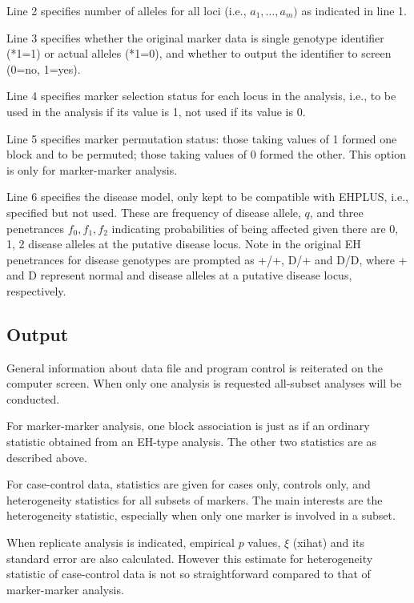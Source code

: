 \documentclass[11pt]{article}
\begin{document}
\medskip
\noindent Line 2 specifies number of alleles for all loci (i.e., $a_1,
\ldots, a_m)$ as indicated in line 1.

\medskip
\noindent Line 3 specifies whether the original marker data is single genotype identifier
(*1=1) or actual alleles (*1=0), and whether to output the identifier to screen
(0=no, 1=yes).

\medskip
\noindent Line 4 specifies marker selection status for each locus in the analysis, i.e.,
to be used in the analysis if its value is 1, not used if its value is 0.

\medskip
\noindent Line 5 specifies marker permutation status:  those taking values of 1 formed
one block and to be permuted; those taking values of 0 formed the other.  This
option is only for marker-marker analysis.

\medskip
\noindent Line 6 specifies the disease model, only kept to be compatible
with EHPLUS, i.e., specified but not used.  These are frequency of disease
allele, $q$, and three penetrances $f_0, f_1 ,f_2$ indicating
probabilities of being affected given there are 0, 1, 2 disease alleles at
the putative disease locus.  Note in the original EH penetrances for
disease genotypes are prompted as +/+, D/+ and D/D, where + and D
represent normal and disease alleles at a putative disease locus,
respectively.


\subsection{Output}

General information about data file and program control is reiterated on the
computer screen.  When only one analysis is requested all-subset analyses will
be conducted.

For marker-marker analysis, one block association is just as if an ordinary
statistic obtained from an EH-type analysis.  The other two statistics are as
described above.

For case-control data, statistics are given for cases only, controls only, and
heterogeneity statistics for all subsets of markers.  The main interests are
the heterogeneity statistic, especially when only one marker is involved in a
subset.

When replicate analysis is indicated, empirical $p$ values, $\hat\xi$ (xihat)
and its standard error are also calculated.  However this estimate for
heterogeneity statistic of case-control data is not so straightforward compared
to that of marker-marker analysis.
\end{document}
